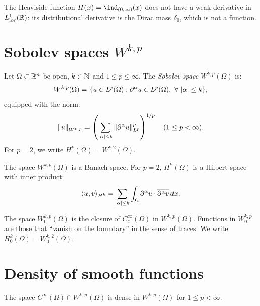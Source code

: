 \begin{example}
The Heaviside function $H(x) = \ind_{(0,\infty)}(x)$ does not have a weak
derivative in $L^1_{\mathrm{loc}}(\mathbb{R})$: its distributional derivative is the
Dirac mass $\delta_0$, which is not a function.
\end{example}

\section{Sobolev spaces $W^{k,p}$}

\begin{definition}
Let $\Omega \subset \mathbb{R}^n$ be open, $k \in \mathbb{N}$ and $1 \leq p \leq \infty$.
The \emph{Sobolev space} $W^{k,p}(\Omega)$ is:
\[
    W^{k,p}(\Omega) = \{ u \in L^p(\Omega) : \partial^\alpha u \in L^p(\Omega),\;
    \forall\, \left| \alpha \right| \leq k \},
\]
equipped with the norm:
\[
    \left\| u \right\|_{W^{k,p}} = \left( \sum_{\left| \alpha \right| \leq k}
    \left\| \partial^\alpha u \right\|_{L^p}^p \right)^{1/p}
    \quad (1 \leq p < \infty).
\]
For $p = 2$, we write $H^k(\Omega) = W^{k,2}(\Omega)$.
\end{definition}

\begin{theorem}[Completeness]
The space $W^{k,p}(\Omega)$ is a Banach space. For $p = 2$, $H^k(\Omega)$ is a
Hilbert space with inner product:
\[
    \langle u, v \rangle_{H^k} = \sum_{\left| \alpha \right| \leq k} \int_\Omega
    \partial^\alpha u \cdot \overline{\partial^\alpha v}\, dx.
\]
\end{theorem}

\begin{definition}
The space $W_0^{k,p}(\Omega)$ is the closure of $C_c^\infty(\Omega)$ in
$W^{k,p}(\Omega)$. Functions in $W_0^{k,p}$ are those that ``vanish on the
boundary'' in the sense of traces. We write $H_0^k(\Omega) = W_0^{k,2}(\Omega)$.
\end{definition}

\section{Density of smooth functions}

\begin{theorem}
The space $C^\infty(\Omega) \cap W^{k,p}(\Omega)$ is dense in $W^{k,p}(\Omega)$
for $1 \leq p < \infty$.
\end{theorem}

